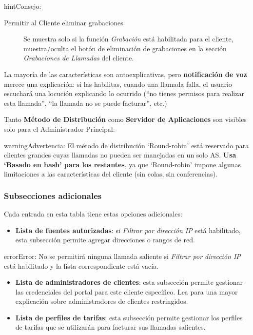 \documentclass[letterpaper,10pt,spanish]{sphinxmanual}
\begin{document}
\begin{notice}{hint}{Consejo:}
\begin{description}
\item[{Permitir al Cliente eliminar grabaciones}] \leavevmode
Se muestra solo si la función \emph{Grabación} está habilitada para el cliente, muestra/oculta el botón de eliminación de grabaciones en la sección \emph{Grabaciones de Llamadas} del cliente.

\end{description}
\end{notice}

La mayoría de las características son autoexplicativas, pero \textbf{notificación de voz} merece una explicación: si las habilitas, cuando una llamada falla, el usuario escuchará una locución explicando lo ocurrido (``no tienes permisos para realizar esta llamada'', ``la llamada no se puede facturar'', etc.)

Tanto \textbf{Método de Distribución} como \textbf{Servidor de Aplicaciones} son visibles solo para el Administrador Principal.

\begin{notice}{warning}{Advertencia:}
El método de distribución `Round-robin' está reservado para clientes grandes cuyas llamadas no pueden ser manejadas en un solo AS. \textbf{Usa `Basado en hash' para los restantes}, ya que `Round-robin' impone algunas limitaciones a las características del cliente (sin colas, sin conferencias).
\end{notice}


\subsubsection{Subsecciones adicionales}
\label{administration_portal/brand/clients/virtual_pbx:additional-subsections}
Cada entrada en esta tabla tiene estas opciones adicionales:
\begin{itemize}
\item {} 
\textbf{Lista de fuentes autorizadas}: si \emph{Filtrar por dirección IP} está habilitado, esta subsección permite agregar direcciones o rangos de red.

\end{itemize}

\begin{notice}{error}{Error:}
No se permitirá ninguna llamada saliente si \emph{Filtrar por dirección IP} está habilitado y la lista correspondiente está vacía.
\end{notice}
\begin{itemize}
\item {} 
\textbf{Lista de administradores de clientes}: esta subsección permite gestionar las credenciales del portal para este cliente específico. Lea {\hyperref[api_rest/acls:acls]{}} para una mayor explicación sobre administradores de clientes restringidos.

\item {} 
\textbf{Lista de perfiles de tarifas}: esta subsección permite gestionar los perfiles de tarifas que se utilizarán para facturar sus llamadas salientes.

\end{itemize}
\end{document}
